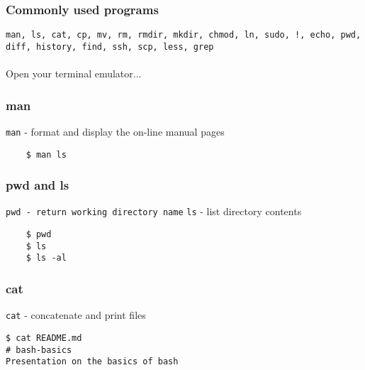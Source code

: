 \documentclass{beamer}
\begin{document}
\begin{frame}
\frametitle{Commonly used programs}
\texttt{man, ls, cat, cp, mv, rm, rmdir, mkdir, chmod, ln, sudo, !, echo, pwd, diff, history, find, ssh, scp, less, grep}
\\~\\
Open your terminal emulator...
\end{frame}


\begin{frame}[fragile]
\frametitle{man}
	\texttt{man} - format and display the on-line manual pages
	\begin{verbatim}
	$ man ls
	\end{verbatim}
\end{frame}


\begin{frame}[fragile]
\frametitle{pwd and ls}
	\texttt{pwd - return working directory name}
	\texttt{ls} - list directory contents	
	\begin{verbatim}
	$ pwd
	$ ls
	$ ls -al
	\end{verbatim}
\end{frame}


\begin{frame}[fragile]
\frametitle{cat}
	\texttt{cat} - concatenate and print files
	\begin{verbatim}
$ cat README.md
# bash-basics
Presentation on the basics of bash
	\end{verbatim}
\end{frame}
\end{document}
